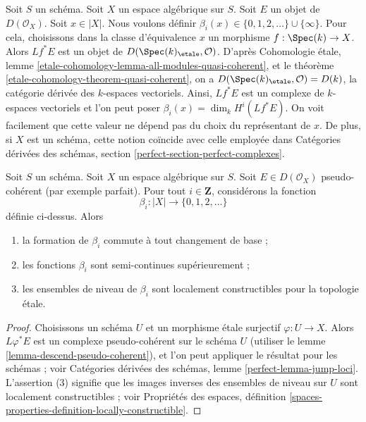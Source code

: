 \medskip\noindent
Soit $S$ un sch\'ema. Soit $X$ un espace alg\'ebrique sur $S$.
Soit $E$ un objet de $D(\mathcal{O}_X)$.
Soit $x\in|X|$. Nous voulons d\'efinir
$\beta_i(x)\in\{0,1,2,\ldots\}\cup\{\infty\}$.
Pour cela, choisissons dans la classe d'\'equivalence $x$ un morphisme
$f:\Spec(k)\to X$. Alors $Lf^*E$ est un objet de
$D(\Spec(k)_\etale,\mathcal{O})$.
D'apr\`es Cohomologie \'etale, lemme
\ref{etale-cohomology-lemma-all-modules-quasi-coherent}, et le th\'eor\`eme
\ref{etale-cohomology-theorem-quasi-coherent}, on a
$D(\Spec(k)_\etale,\mathcal{O})=D(k)$, la cat\'egorie d\'eriv\'ee des
$k$-espaces vectoriels. Ainsi, $Lf^*E$ est un complexe de $k$-espaces
vectoriels et l'on peut poser
$\beta_i(x)=\dim_k H^i(Lf^*E)$. On voit facilement que cette valeur ne d\'epend
pas du choix du repr\'esentant de $x$. De plus, si $X$ est un sch\'ema, cette
notion co\"incide avec celle employ\'ee dans Cat\'egories d\'eriv\'ees des
sch\'emas, section \ref{perfect-section-perfect-complexes}.

\begin{lemma}
\label{lemma-jump-loci}
Soit $S$ un sch\'ema. Soit $X$ un espace alg\'ebrique sur $S$.
Soit $E\in D(\mathcal{O}_X)$ pseudo-coh\'erent (par exemple parfait).
Pour tout $i\in\mathbf{Z}$, consid\'erons la fonction
$$
\beta_i : |X| \longrightarrow \{0, 1, 2, \ldots\}
$$
d\'efinie ci-dessus. Alors
\begin{enumerate}
\item la formation de $\beta_i$ commute \`a tout changement de base ;
\item les fonctions $\beta_i$ sont semi-continues sup\'erieurement ;
\item les ensembles de niveau de $\beta_i$ sont localement constructibles
pour la topologie \'etale.
\end{enumerate}
\end{lemma}

\begin{proof}
Choisissons un sch\'ema $U$ et un morphisme \'etale surjectif
$\varphi:U\to X$. Alors $L\varphi^*E$ est un complexe pseudo-coh\'erent sur le
sch\'ema $U$ (utiliser le lemme \ref{lemma-descend-pseudo-coherent}), et l'on
peut appliquer le r\'esultat pour les sch\'emas ; voir Cat\'egories d\'eriv\'ees
des sch\'emas, lemme \ref{perfect-lemma-jump-loci}. L'assertion (3) signifie
que les images inverses des ensembles de niveau sur $U$ sont localement
constructibles ; voir Propri\'et\'es des espaces, d\'efinition
\ref{spaces-properties-definition-locally-constructible}.
\end{proof}

